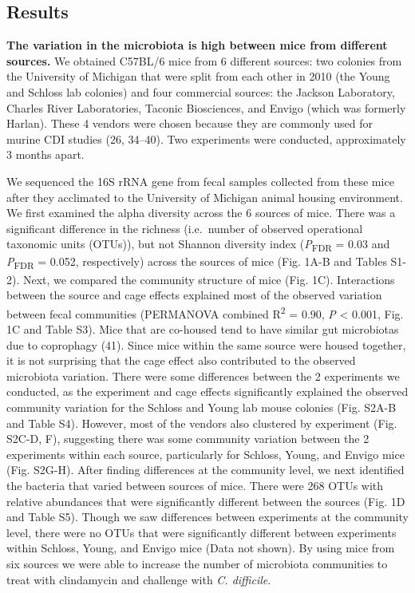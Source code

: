 \documentclass[
  11pt,
]{article}
\begin{document}
\hypertarget{results}{%
\subsection{Results}\label{results}}

\textbf{The variation in the microbiota is high between mice from
different sources.} We obtained C57BL/6 mice from 6 different sources:
two colonies from the University of Michigan that were split from each
other in 2010 (the Young and Schloss lab colonies) and four commercial
sources: the Jackson Laboratory, Charles River Laboratories, Taconic
Biosciences, and Envigo (which was formerly Harlan). These 4 vendors
were chosen because they are commonly used for murine CDI studies (26,
34--40). Two experiments were conducted, approximately 3 months apart.

We sequenced the 16S rRNA gene from fecal samples collected from these
mice after they acclimated to the University of Michigan animal housing
environment. We first examined the alpha diversity across the 6 sources
of mice. There was a significant difference in the richness (i.e.~number
of observed operational taxonomic units (OTUs)), but not Shannon
diversity index (\emph{P}\textsubscript{FDR} = 0.03 and
\emph{P}\textsubscript{FDR} = 0.052, respectively) across the sources of
mice (Fig. 1A-B and Tables S1-2). Next, we compared the community
structure of mice (Fig. 1C). Interactions between the source and cage
effects explained most of the observed variation between fecal
communities (PERMANOVA combined R\textsuperscript{2} = 0.90, \emph{P}
\textless{} 0.001, Fig. 1C and Table S3). Mice that are co-housed tend
to have similar gut microbiotas due to coprophagy (41). Since mice
within the same source were housed together, it is not surprising that
the cage effect also contributed to the observed microbiota variation.
There were some differences between the 2 experiments we conducted, as
the experiment and cage effects significantly explained the observed
community variation for the Schloss and Young lab mouse colonies (Fig.
S2A-B and Table S4). However, most of the vendors also clustered by
experiment (Fig. S2C-D, F), suggesting there was some community
variation between the 2 experiments within each source, particularly for
Schloss, Young, and Envigo mice (Fig. S2G-H). After finding differences
at the community level, we next identified the bacteria that varied
between sources of mice. There were 268 OTUs with relative abundances
that were significantly different between the sources (Fig. 1D and Table
S5). Though we saw differences between experiments at the community
level, there were no OTUs that were significantly different between
experiments within Schloss, Young, and Envigo mice (Data not shown). By
using mice from six sources we were able to increase the number of
microbiota communities to treat with clindamycin and challenge with
\emph{C. difficile}.
\end{document}
